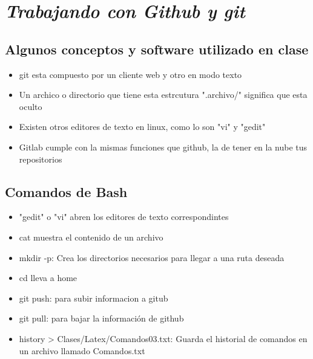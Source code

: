 \documentclass{book}
\begin{document}
	




   \section{\textit{Trabajando con Github y git}}%
\begin{flushright}
	\date{09 de enero de 2019}
\end{flushright}
   
   	\subsection {Algunos conceptos y software utilizado en clase}%
   	\begin{itemize}
   		\item git esta compuesto por un cliente web y otro en modo texto
   		\item Un archico o directorio que tiene esta estrcutura ".archivo/" significa que esta oculto
   		\item Existen otros editores de texto en linux, como lo son "vi" y "gedit"
   		\item Gitlab cumple con la mismas funciones que github, la de tener en la nube tus repositorios
   	\end{itemize}
   	
   	\subsection {Comandos de Bash}%
   	\begin{itemize}%
   		\item "gedit" o "vi" abren los editores de texto correspondintes
   		\item cat muestra el contenido de un archivo
   		\item mkdir -p: Crea los directorios necesarios para llegar a una ruta deseada
   		\item cd lleva a home
   		\item git push: para subir informacion a gitub
   		\item git pull: para bajar la información de github
   		\item history > Clases/Latex/Comandos03.txt:  Guarda el historial de comandos en un archivo llamado Comandos.txt
   		
   		
   	\end{itemize}%
\end{document}
